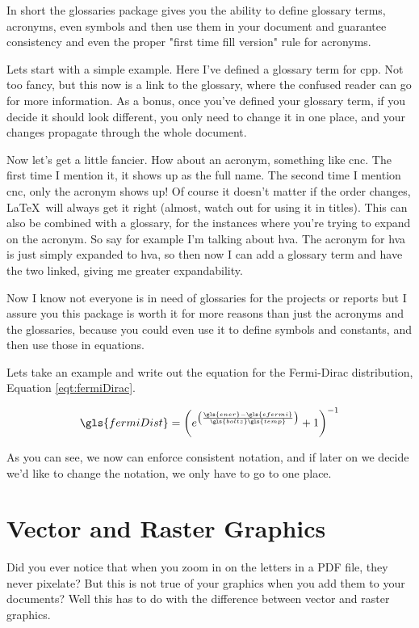 \documentclass[hidelinks, float=false, crop=false]{article}
\begin{document}
        In short the glossaries package gives you the ability to define glossary terms, acronyms, 
        even symbols and then use them in your document and guarantee consistency and even the proper
        "first time fill version" rule for acronyms.

        Lets start with a simple example. Here I've defined a glossary term for \gls{cpp}. Not 
        too fancy, but this now is a link to the glossary, where the confused reader can go for more
        information. As a bonus, once you've defined your glossary term, if you decide it should look 
        different, you only need to change it in one place, and your changes propagate through the
        whole document.
        
        Now let's get a little fancier. How about an acronym, something like \gls{cnc}. The first time
        I mention it, it shows up as the full name. The second time I mention \gls{cnc}, only the 
        acronym shows up! Of course it doesn't matter if the order changes, \LaTeX~will always get it 
        right (almost, watch out for using it in titles). This can also be combined with a glossary,
        for the instances where you're trying to expand on the acronym. So say for example I'm talking
        about \gls{hva}. The acronym for \gls{hva} is just simply expanded to \glsdesc{hva},
        so then now I can add a glossary term and have the two linked, giving me greater expandability.

        Now I know not everyone is in need of glossaries for the projects or reports but I assure you
        this package is worth it for more reasons than just the acronyms and the glossaries, because
        you could even use it to define symbols and constants, and then use those in equations.

        Lets take an example and write out the equation for the Fermi-Dirac distribution, Equation \ref{eqt:fermiDirac}.

        \begin{equation}
            \gls{fermiDist} = \left(e^{\left(\frac{\gls{ener}-\gls{efermi}}{\gls{boltz}\gls{temp}}\right)}+1\right)^{-1}
            \label{eqt:fermiDirac}
        \end{equation}

        As you can see, we now can enforce consistent notation, and if later on we decide we'd like
        to change the notation, we only have to go to one place.
        

    \section{Vector and Raster Graphics}
        Did you ever notice that when you zoom in on the letters in a PDF file, they never pixelate?
        But this is not true of your graphics when you add them to your documents? Well this has
        to do with the difference between vector and raster graphics. 
\end{document}
